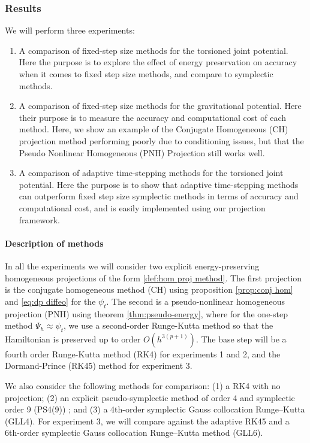 \documentclass[final,3p,times]{elsarticle}
\begin{document}
\subsubsection{Results}
We will perform three experiments: 
\begin{enumerate}
  \item A comparison of fixed-step size methods for the torsioned joint potential. Here the purpose is to explore the effect of energy preservation on accuracy when it comes to fixed step size methods, and compare to symplectic methods. 
  \item A comparison of fixed-step size methods for the gravitational potential. Here their purpose is to measure the accuracy and computational cost of each method. Here, we show an example of the Conjugate Homogeneous (CH) projection method performing poorly due to conditioning issues, but that the Pseudo Nonlinear Homogeneous (PNH) Projection still works well.  
  \item A comparison of adaptive time-stepping methods for the torsioned joint potential. Here the purpose is to show that adaptive time-stepping methods can outperform fixed step size symplectic methods in terms of accuracy and computational cost, and is easily implemented using our projection framework. 
\end{enumerate}

\paragraph{Description of methods} In all the experiments we will consider two explicit energy-preserving homogeneous projections of the form \ref{def:hom proj method}. The first projection is the conjugate homogeneous method (CH) using proposition \ref{prop:conj hom} and \ref{eq:dp diffeo} for the $\psi_t$. The second is a pseudo-nonlinear homogeneous projection (PNH) using theorem \ref{thm:pseudo-energy}, where for the one-step method $\Psi_h\approx \psi_t$, we use a second-order Runge-Kutta method so that the Hamiltonian is preserved up to order $O(h^{3(p+1)})$. The base step will be a fourth order Runge-Kutta method (RK4) for experiments 1 and 2, and the Dormand-Prince (RK45) method for experiment 3.


We also consider the following methods for comparison: (1) a RK4 with no projection; (2) an explicit pseudo-symplectic method of order 4 and symplectic order 9 (PS4(9)) \cite{mclachlan2024runge, tao2016explicit}; and (3) a 4th-order symplectic Gauss collocation Runge–Kutta (GLL4). For experiment 3, we will compare against the adaptive RK45 and a 6th-order symplectic Gauss collocation Runge–Kutta method (GLL6).
\end{document}
